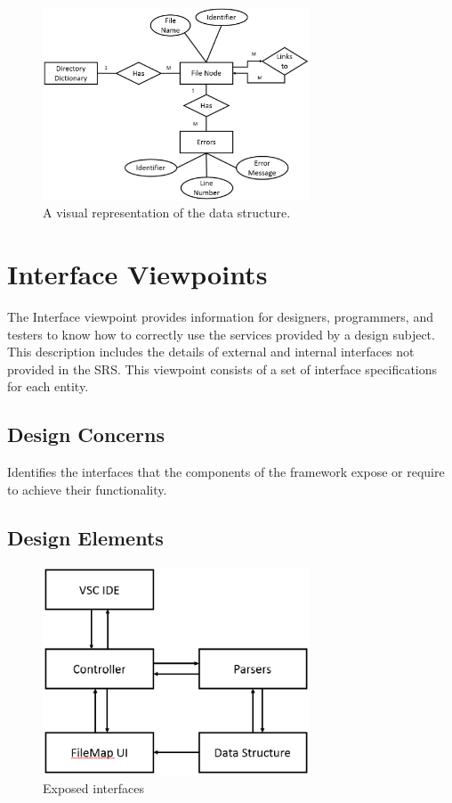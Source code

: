 \documentclass[letterpaper,10pt,titlepage,draftclsnofoot,onecolumn,onesided] {IEEEtran}
\begin{document}
\begin{figure}
	\includegraphics[width=300px]{InformationERDEPS.eps}
	\caption{A visual representation of the data structure.}
\end{figure}
				
\section{Interface Viewpoints}
The Interface viewpoint provides information for designers, programmers, and testers to know how to correctly use the services provided by a design subject. 
This description includes the details of external and internal interfaces not provided in the SRS. This viewpoint consists of a set of interface specifications for each entity. 

\subsection{Design Concerns}
Identifies the interfaces that the components of the framework expose or require to achieve their functionality. 

\subsection{Design Elements}

\begin{figure}
\includegraphics[width=300px]{InterfaceUMLEPS.eps}
	\caption{Exposed interfaces}
\end{figure}
\end{document}
